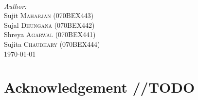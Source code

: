 \documentclass[12pt]{article}
\begin{document}
\begin{titlepage}
~

\Large \emph{Author:}\\
Sujit \textsc{Maharjan} (070BEX443) \\
Sujal \textsc{Dhungana} (070BEX442)\\
Shreya \textsc{Agarwal} (070BEX441)\\
Sujita \textsc{Chaudhary} (070BEX444)\\[1cm]


{\large \today}\\[1cm] %


\vfill %

\end{titlepage}

\section{Acknowledgement //TODO}
\end{document}
